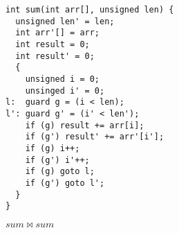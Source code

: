 \begin{figure}
\centering
\begin{lstlisting}
int sum(int arr[], unsigned len) {
  unsigned len' = len;
  int arr'[] = arr;
  int result = 0;
  int result' = 0;
  {
    unsigned i = 0;
    unsinged i' = 0;
l:  guard g = (i < len);
l': guard g' = (i' < len');
    if (g) result += arr[i];
    if (g') result' += arr'[i'];
    if (g) i++;
    if (g') i'++;
    if (g) goto l;
    if (g') goto l';
  }
}
\end{lstlisting}
\caption{$sum \bowtie sum$}
\end{figure} 